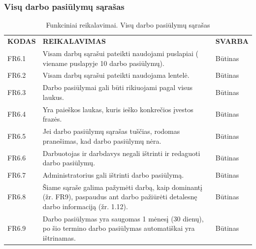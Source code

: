 \documentclass{VUMIFPSkursinis}
\begin{document}
\subsubsection{Visų darbo pasiūlymų sąrašas}
\begin{table}[H]
\caption{Funkciniai reikalavimai. Visų darbo pasiūlymų sąrašas}
\centering
\normalsize
\begin{tabular}{|p{2cm}|p{10cm}|p{3cm}|}
\hline
\rowcolor{gray!30}
\multicolumn{3}{|l|}{\textbf{6. Visų darbų sąrašas}} \\ \hline
\textbf{KODAS}& \multicolumn{1}{m{10cm}|}{\textbf{REIKALAVIMAS}} & \textbf{SVARBA} \\ \hline
FR6.1 & \multicolumn{1}{m{10cm}|}{Visam darbų sąrašui pateikti naudojami puslapiai ( viename puslapyje 10 darbo pasiūlymų).} & Būtinas \\ \hline
FR6.2 & \multicolumn{1}{m{10cm}|}{Visam darbų sąrašui pateikti naudojama lentelė.} & Būtinas \\ \hline
FR6.3 & \multicolumn{1}{m{10cm}|}{Darbo pasiūlymai gali būti rikiuojami pagal visus laukus.} & Būtinas \\ \hline
FR6.4 & \multicolumn{1}{m{10cm}|}{Yra paieškos laukas, kuris ieško konkrečios įvestos frazės.} & Būtinas \\ \hline
FR6.5 & \multicolumn{1}{m{10cm}|}{Jei darbo pasiūlymų sąrašas tuščias, rodomas pranešimas, kad darbo pasiūlymų nėra.} & Būtinas \\ \hline
FR6.6 & \multicolumn{1}{m{10cm}|}{Darbuotojas ir darbdavys negali ištrinti ir redaguoti darbo pasiūlymų.} & Būtinas \\ \hline
FR6.7 & \multicolumn{1}{m{10cm}|}{Administratorius gali ištrinti darbo pasiūlymą.} & Būtinas \\ \hline
FR6.8 & \multicolumn{1}{m{10cm}|}{Šiame sąraše galima  pažymėti darbą, kaip dominantį (žr. FR9), paspaudus ant darbo pažiūrėti detalesnę darbo informaciją (žr. 1.12).} & Būtinas \\ \hline
FR6.9 & \multicolumn{1}{m{10cm}|}{Darbo pasiūlymas yra saugomas 1 mėnesį (30 dienų), po šio termino darbo pasiūlymas automatiškai yra ištrinamas.} & Būtinas \\ \hline
\end{tabular}
\end{table}
\end{document}
